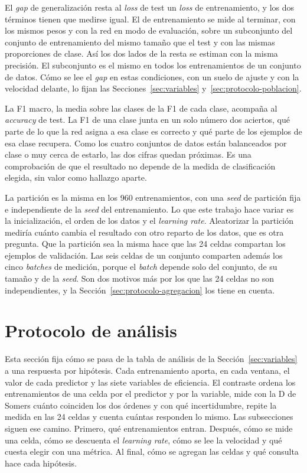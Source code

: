 El \emph{gap} de generalización resta al \emph{loss} de test un \emph{loss} de entrenamiento, y los dos términos tienen que medirse igual. El de entrenamiento se mide al terminar, con los mismos pesos y con la red en modo de evaluación, sobre un subconjunto del conjunto de entrenamiento del mismo tamaño que el test y con las mismas proporciones de clase. Así los dos lados de la resta se estiman con la misma precisión. El subconjunto es el mismo en todos los entrenamientos de un conjunto de datos. Cómo se lee el \emph{gap} en estas condiciones, con un suelo de ajuste y con la velocidad delante, lo fijan las Secciones~\ref{sec:variables} y~\ref{sec:protocolo-poblacion}.

La F1 macro, la media sobre las clases de la F1 de cada clase, acompaña al \emph{accuracy} de test. La F1 de una clase junta en un solo número dos aciertos, qué parte de lo que la red asigna a esa clase es correcto y qué parte de los ejemplos de esa clase recupera. Como los cuatro conjuntos de datos están balanceados por clase o muy cerca de estarlo, las dos cifras quedan próximas. Es una comprobación de que el resultado no depende de la medida de clasificación elegida, sin valor como hallazgo aparte.

La partición es la misma en los 960 entrenamientos, con una \emph{seed} de partición fija e independiente de la \emph{seed} del entrenamiento. Lo que este trabajo hace variar es la inicialización, el orden de los datos y el \emph{learning rate}. Aleatorizar la partición mediría cuánto cambia el resultado con otro reparto de los datos, que es otra pregunta. Que la partición sea la misma hace que las 24 celdas compartan los ejemplos de validación. Las seis celdas de un conjunto comparten además los cinco \emph{batches} de medición, porque el \emph{batch} depende solo del conjunto, de su tamaño y de la \emph{seed}. Son dos motivos más por los que las 24 celdas no son independientes, y la Sección~\ref{sec:protocolo-agregacion} los tiene en cuenta.

\section{Protocolo de análisis}
\label{sec:protocolo-analisis}

Esta sección fija cómo se pasa de la tabla de análisis de la Sección~\ref{sec:variables} a una respuesta por hipótesis. Cada entrenamiento aporta, en cada ventana, el valor de cada predictor y las siete variables de eficiencia. El contraste ordena los entrenamientos de una celda por el predictor y por la variable, mide con la D de Somers cuánto coinciden los dos órdenes y con qué incertidumbre, repite la medida en las 24 celdas y cuenta cuántas responden lo mismo. Las subsecciones siguen ese camino. Primero, qué entrenamientos entran. Después, cómo se mide una celda, cómo se descuenta el \emph{learning rate}, cómo se lee la velocidad y qué cuesta elegir con una métrica. Al final, cómo se agregan las celdas y qué consulta hace cada hipótesis.

